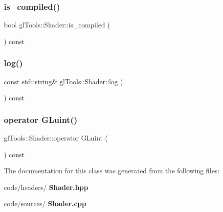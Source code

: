 \mbox{\label{classgl_tools_1_1_shader_a3c35551085667ba0d9542d9b61d14b73}} 
\subsubsection{is\_compiled()}
{\footnotesize\ttfamily bool gl\+Tools\+::\+Shader\+::is\+\_\+compiled (\begin{DoxyParamCaption}{ }\end{DoxyParamCaption}) const\hspace{0.3cm}{\ttfamily [inline]}}

\mbox{\label{classgl_tools_1_1_shader_a5b33e2e17347c6d19851bae0e887c2d5}} 
\subsubsection{log()}
{\footnotesize\ttfamily const std\+::string\& gl\+Tools\+::\+Shader\+::log (\begin{DoxyParamCaption}{ }\end{DoxyParamCaption}) const\hspace{0.3cm}{\ttfamily [inline]}}

\mbox{\label{classgl_tools_1_1_shader_aedec713754571da06b78750976afd3e0}} 
\subsubsection{operator GLuint()}
{\footnotesize\ttfamily gl\+Tools\+::\+Shader\+::operator G\+Luint (\begin{DoxyParamCaption}{ }\end{DoxyParamCaption}) const\hspace{0.3cm}{\ttfamily [inline]}}



The documentation for this class was generated from the following files\+:\begin{DoxyCompactItemize}
\item 
code/headers/\textbf{ Shader.\+hpp}\item 
code/sources/\textbf{ Shader.\+cpp}\end{DoxyCompactItemize}
